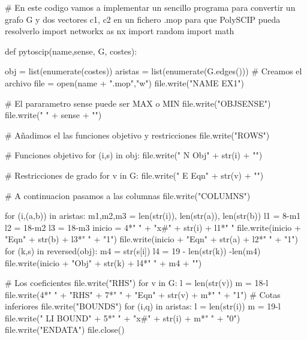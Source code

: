 \documentclass[twoside,a4paper,openright,12pt,tikz]{book}
\begin{document}
\begin{pythone}
# En este codigo vamos a implementar un sencillo programa para convertir un grafo G y dos vectores c1, c2 en un fichero .mop para que PolySCIP pueda resolverlo
import networkx as nx
import random
import math

def pytoscip(name,sense, G, costes):
    
    obj = list(enumerate(costes))
    aristas = list(enumerate(G.edges()))
    # Creamos el archivo
    file = open(name + ".mop","w") 
    file.write("NAME          EX1\n") 
    
    # El pararametro sense puede ser MAX o MIN
    file.write("OBJSENSE\n")    
    file.write(" " + sense + "\n") 

    # Añadimos el las funciones objetivo y restricciones
    file.write("ROWS\n")
    
    # Funciones objetivo
    for (i,s) in obj:
        file.write(" N  Obj" + str(i) + "\n")  
           
    # Restricciones de grado
    for v in G:
        file.write(" E  Eqn" + str(v) + "\n")
        
    # A continuacion pasamos a las columnas
    file.write("COLUMNS\n")
    
    for (i,(a,b)) in aristas:
        m1,m2,m3 = len(str(i)), len(str(a)), len(str(b))
        l1 = 8-m1
        l2 = 18-m2
        l3 = 18-m3
        inicio = 4*" " + "x#" + str(i) + l1*" " 
        file.write(inicio + "Eqn" + str(b) + l3*" " + "1\n")
        file.write(inicio + "Eqn" + str(a) + l2*" " + "1\n")
        for (k,s) in reversed(obj):
            m4 = str(s[i])
            l4 = 19 - len(str(k)) -len(m4)
            file.write(inicio + "Obj" + str(k) + l4*" " + m4 + "\n")
           
    # Los coeficientes
    file.write("RHS\n")
    for v in G:
        l = len(str(v))
        m = 18-l
        file.write(4*" " + "RHS" + 7*" " + "Eqn" + str(v) + m*" " + "1\n")    
    # Cotas inferiores 
    file.write("BOUNDS\n")        
    for (i,q) in aristas:
        l = len(str(i))
        m = 19-l
        file.write(" LI BOUND" + 5*" " + "x#" + str(i) + m*" " + "0\n")    
    file.write("ENDATA")
    file.close()
\end{pythone}

\newpage
\end{document}
